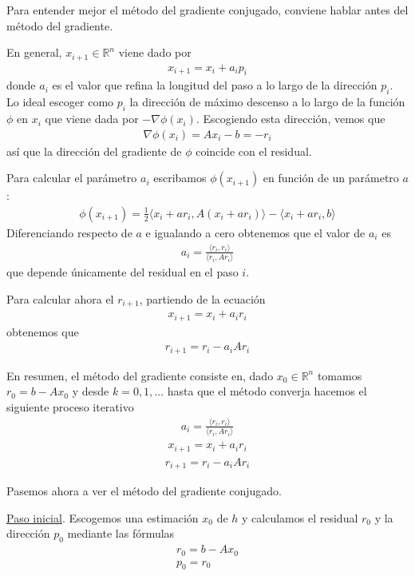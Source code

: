 Para entender mejor el método del gradiente conjugado, conviene hablar antes del método del gradiente.

En general, $x_{i+1}\in\mathbb{R}^n$ viene dado por \begin{gather*}x_{i+1}=x_i+a_ip_i\end{gather*}
donde $a_i$ es el valor que refina la longitud del paso a lo largo de la dirección $p_i$. Lo ideal escoger como $p_i$ la dirección de máximo descenso a lo largo de la función $\phi$ en $x_i$ que viene dada por $-\nabla\phi(x_i)$. Escogiendo esta dirección, vemos que \begin{gather*}\nabla\phi(x_i)=Ax_i-b=-r_i\end{gather*}
así que la dirección del gradiente de $\phi$ coincide con el residual.

Para calcular el parámetro $a_i$ escribamos $\phi(x_{i+1})$ en función de un parámetro $a$:
\begin{gather*}\phi(x_{i+1})=\frac{1}{2}\langle{x_i+ar_i, A(x_i+ar_i)\rangle}-\langle{x_i+ar_i, b\rangle}\end{gather*}
Diferenciando respecto de $a$ e igualando a cero obtenemos que el valor de $a_i$ es
\begin{gather*}a_i=\frac{\langle{r_i, r_i\rangle}}{\langle{r_i, Ar_i\rangle}}\end{gather*}
que depende únicamente del residual en el paso $i$.

Para calcular ahora el $r_{i+1}$, partiendo de la ecuación
\begin{gather*}x_{i+1}=x_i+a_ir_i\end{gather*}
obtenemos que
\begin{gather*}r_{i+1}=r_i-a_iAr_i\end{gather*}

En resumen, el método del gradiente consiste en, dado $x_0\in\mathbb{R}^n$ tomamos $r_0=b-Ax_0$ y desde $k=0, 1, \ldots$ hasta que el método converja hacemos el siguiente proceso iterativo 
\begin{gather*}a_i=\frac{\langle{r_i, r_i\rangle}}{\langle{r_i, Ar_i\rangle}}\end{gather*}
\begin{gather*}x_{i+1}=x_i+a_ir_i\end{gather*}
\begin{gather*}r_{i+1}=r_i-a_iAr_i\end{gather*}

Pasemos ahora a ver el método del gradiente conjugado.

\underline{Paso inicial}. Escogemos una estimación $x_0$ de $h$ y calculamos el residual $r_0$ y la dirección $p_0$ mediante las fórmulas
\begin{gather*}r_0=b-Ax_0  \\ p_0=r_0\end{gather*}

